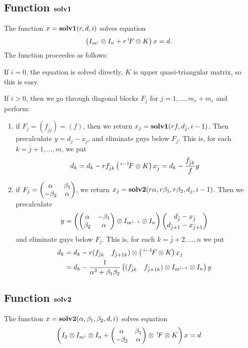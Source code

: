 \documentclass[11pt,a4paper]{article}
\begin{document}
\subsection{Function $\mathbf{solv1}$}

The function $x=\mathbf{solv1}(r,d,i)$ solves equation
$$\left(I_{m^i}\otimes I_n+r\,^i\!F\otimes K\right)x = d.$$
The function proceedes as follows:

If $i=0$, the equation is solved directly, $K$ is upper
quasi-triangular matrix, so this is easy.

If $i>0$, then we go through diagonal blocks $F_j$ for
$j=1,\ldots, m_r+m_c$ and perform:
\begin{enumerate}
\item if $F_j=(f_{\bar j\bar j}) = (f)$, then we return
$x_j=\mathbf{solv1}(rf,d_{\bar j}, i-1)$. Then precalculate $y=d_j-x_j$, and
eliminate guys below $F_j$. This is, for each $k=\bar j+1,\ldots, m$, we
put
$$d_k = d_k-rf_{\bar jk}\left(\,^{i-1}\!F\otimes K\right)x_{\bar j}=
d_k - \frac{f_{\bar jk}}{f}y$$

\item if $F_j=\begin{pmatrix}\alpha&\beta_1\cr -\beta_2&\alpha\end{pmatrix}$,
we return $x_j=\mathbf{solv2}(r\alpha, r\beta_1, r\beta_2, d_j, i-1)$. Then
we precalculate 
$$y=\left(\begin{pmatrix}\alpha&-\beta_1\cr \beta_2&\alpha\end{pmatrix}
\otimes I_{m^{i-1}}\otimes I_n\right)
\begin{pmatrix} d_{\bar j} - x_{\bar j}\cr
         d_{\bar j+1} - x_{\bar j+1}
\end{pmatrix}$$
and eliminate guys below $F_j$. This is, for each $k=\bar j+2,\ldots, n$
we put
\begin{align*}
d_k &= d_k - r(f_{{\bar j}k}\quad f_{{\bar j}+1 k})
               \otimes\left(\,^{i-1}\!F\otimes K\right)x_j\\
    &= d_k - \frac{1}{\alpha^2+\beta_1\beta_2}
              \left((f_{{\bar j}k}\quad f_{{\bar j}+1 k})
               \otimes I_{m^{i-1}}\otimes I_n\right)y
\end{align*}

\end{enumerate}

\subsection{Function $\mathbf{solv2}$}

The function $x=\mathbf{solv2}(\alpha, \beta_1, \beta_2, d, i)$ solves
equation
$$
\left(I_2\otimes I_{m^i}\otimes I_n +
\begin{pmatrix}\alpha&\beta_1\cr-\beta_2&\alpha\end{pmatrix}
\otimes\,^i\!F\otimes K\right)x=d
$$
\end{document}
